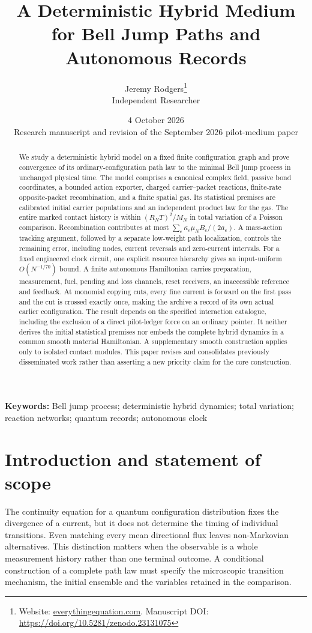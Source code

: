 \documentclass[11pt]{article}
\title{\bfseries A Deterministic Hybrid Medium for Bell Jump Paths and Autonomous Records}
\author{Jeremy Rodgers\thanks{Website: \href{https://everythingequation.com}{everythingequation.com}. Manuscript DOI: \url{https://doi.org/10.5281/zenodo.23131075}}\\\small Independent Researcher}
\date{4 October 2026\\\small Research manuscript and revision of the September 2026 pilot-medium paper}
\theoremstyle{definition}\newtheorem{definition}[theorem]{Definition}
\theoremstyle{remark}\newtheorem{remark}[theorem]{Remark}
\begin{document}
\maketitle
\begin{abstract}
We study a deterministic hybrid model on a fixed finite configuration graph and prove convergence of its ordinary-configuration path law to the minimal Bell jump process in unchanged physical time. The model comprises a canonical complex field, passive bond coordinates, a bounded action exporter, charged carrier--packet reactions, finite-rate opposite-packet recombination, and a finite spatial gas. Its statistical premises are calibrated initial carrier populations and an independent product law for the gas. The entire marked contact history is within $(R_NT)^2/M_N$ in total variation of a Poisson comparison. Recombination contributes at most $\sum_e\kappa_e\mu_NB_e/(2a_e)$. A mass-action tracking argument, followed by a separate low-weight path localization, controls the remaining error, including nodes, current reversals and zero-current intervals. For a fixed engineered clock circuit, one explicit resource hierarchy gives an input-uniform $O(N^{-1/70})$ bound. A finite autonomous Hamiltonian carries preparation, measurement, fuel, pending and loss channels, reset receivers, an inaccessible reference and feedback. At monomial copying cuts, every fine current is forward on the first pass and the cut is crossed exactly once, making the archive a record of its own actual earlier configuration. The result depends on the specified interaction catalogue, including the exclusion of a direct pilot-ledger force on an ordinary pointer. It neither derives the initial statistical premises nor embeds the complete hybrid dynamics in a common smooth material Hamiltonian. A supplementary smooth construction applies only to isolated contact modules. This paper revises and consolidates previously disseminated work rather than asserting a new priority claim for the core construction.
\end{abstract}
\noindent\textbf{Keywords:} Bell jump process; deterministic hybrid dynamics; total variation; reaction networks; quantum records; autonomous clock
\clearpage
{\small\tableofcontents}
\clearpage

\section{Introduction and statement of scope}
The continuity equation for a quantum configuration distribution fixes the divergence of a current, but it does not determine the timing of individual transitions. Even matching every mean directional flux leaves non-Markovian alternatives. This distinction matters when the observable is a whole measurement history rather than one terminal outcome. A conditional construction of a complete path law must specify the microscopic transition mechanism, the initial ensemble and the variables retained in the comparison.
\end{document}
